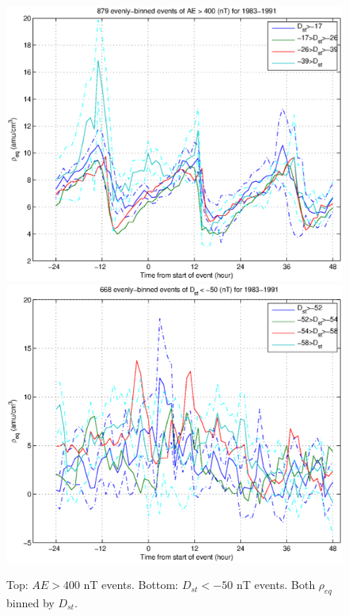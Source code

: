 \documentclass[10pt,twocolumn]{article}
\begin{document}
\begin{figure}[htp!]
\includegraphics[scale=0.45]{paperfigures/HighLowDstrhoeq-AE400.eps}
\includegraphics[scale=0.45]{paperfigures/HighLowDstrhoeq-Dst50.eps}
\caption{Top: $AE > 400$ nT events. Bottom: $D_{st} < -50$ nT events. Both $\rho_{eq}$ binned by $D_{st}$.}
\end{figure}
\clearpage
\end{document}

